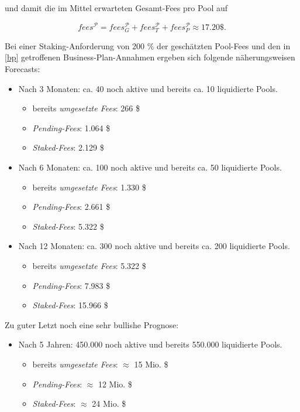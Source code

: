 \begin{Fazit}
und damit die im Mittel erwarteten Gesamt-Fees pro Pool auf

\begin{equation*}
  fees^{\mathcal{P}} = fees_{G}^{\mathcal{P}} + fees_{T}^{\mathcal{P}} + fees_{P}^{\mathcal{P}} \approx 17.20 \$. 
\end{equation*}

\vspace{0.67cm}

Bei einer Staking-Anforderung von 200 \% der geschätzten Pool-Fees  und den in \ref{bp} getroffenen Business-Plan-Annahmen ergeben sich folgende näherungsweisen Forecasts:

\begin{itemize}
	\item Nach 3 Monaten: ca. 40 noch aktive und bereits ca. 10 liquidierte Pools.
	\begin{itemize}
		\item bereits \textit{umgesetzte Fees}: 266 \$ 
		\item \textit{Pending-Fees}: 1.064 \$ 
		\item \textit{Staked-Fees}: 2.129 \$ 
	\end{itemize}
	\item Nach 6 Monaten: ca. 100 noch aktive und bereits ca. 50 liquidierte Pools.
	\begin{itemize}
		\item bereits \textit{umgesetzte Fees}: 1.330 \$ 
		\item \textit{Pending-Fees}: 2.661 \$ 
		\item \textit{Staked-Fees}: 5.322 \$ 
	\end{itemize}
	\item Nach 12 Monaten: ca. 300 noch aktive und bereits ca. 200 liquidierte Pools.
	\begin{itemize}
		\item bereits \textit{umgesetzte Fees}: 5.322 \$ 
		\item \textit{Pending-Fees}: 7.983 \$ 
		\item \textit{Staked-Fees}: 15.966 \$ 
	\end{itemize}	 
\end{itemize}

\vspace{0.5cm}

Zu guter Letzt noch eine sehr bullishe Prognose:

\begin{itemize}
	\item Nach 5 Jahren: 450.000 noch aktive und bereits 550.000 liquidierte Pools.
	\begin{itemize}
		\item bereits \textit{umgesetzte Fees}: $\approx$ 15 Mio. \$ 
		\item \textit{Pending-Fees}: $\approx$ 12 Mio. \$ 
		\item \textit{Staked-Fees}: $\approx$ 24 Mio. \$ 
	\end{itemize}	 
\end{itemize}

\end{Fazit}

